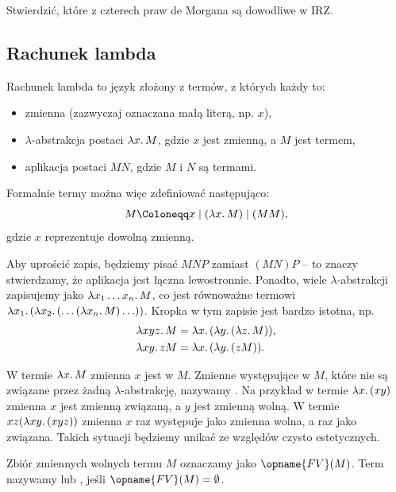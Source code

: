 \documentclass[polish,pretty,bibliography=totocnumbered]{angav}
\newcommand{\FV}{\opname{FV}}
\begin{document}
\begin{problem}
    Stwierdzić, które z czterech praw de Morgana są dowodliwe w IRZ.
\end{problem}

\subsection{Rachunek lambda}

Rachunek lambda to język złożony z termów, z których każdy to:
\begin{itemize}
    \item zmienna (zazwyczaj oznaczana małą literą, np. $x$),
    \item $\lambda$-abstrakcja postaci $\lambda x\ldotp M$, gdzie $x$ jest zmienną, a $M$ jest termem,
    \item aplikacja postaci $MN$, gdzie $M$ i $N$ są termami.
\end{itemize}

Formalnie termy można więc zdefiniować następująco:
\[ M \Coloneqq x \mid (\lambda x\ldotp M) \mid (MM), \]
gdzie $x$ reprezentuje dowolną zmienną.

Aby uprościć zapis, będziemy pisać $MNP$ zamiast $(MN)P$ -- to znaczy stwierdzamy, że aplikacja jest łączna lewostronnie. Ponadto, wiele $\lambda$-abstrakcji zapisujemy jako $\lambda x_1 \ldots x_n\ldotp M$, co jest równoważne termowi $\lambda x_1\ldotp (\lambda x_2\ldotp (\ldots (\lambda x_n\ldotp M) \ldots))$. Kropka w tym zapisie jest bardzo istotna, np.
\begin{align*}
    \lambda xyz\ldotp M &= \lambda x\ldotp (\lambda y\ldotp (\lambda z\ldotp M)), \\
    \lambda xy\ldotp z M &= \lambda x\ldotp (\lambda y\ldotp (z M)).
\end{align*}

W termie $\lambda x\ldotp M$ zmienna $x$ jest  w $M$.
Zmienne występujące w $M$, które nie są związane przez żadną $\lambda$-abstrakcję, nazywamy .
Na przykład w termie $\lambda x\ldotp (x y)$ zmienna $x$ jest zmienną związaną, a $y$ jest zmienną wolną.
W termie $xz(\lambda xy\ldotp (xyz))$ zmienna $x$ raz występuje jako zmienna wolna, a raz jako związana. Takich sytuacji będziemy unikać ze względów czysto estetycznych.

Zbiór zmiennych wolnych termu $M$ oznaczamy jako $\FV(M)$.
Term nazywamy  lub , jeśli $\FV(M) = \emptyset$.
\end{document}
